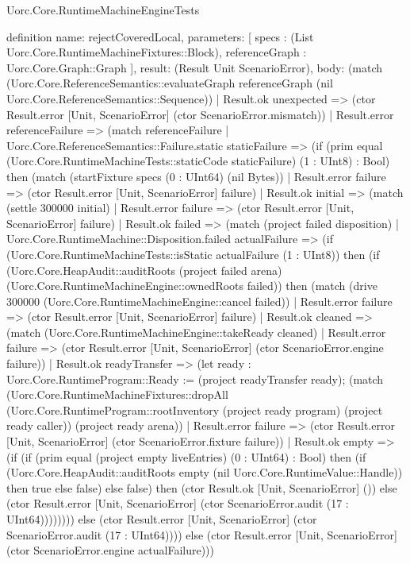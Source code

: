 \begin{lexlean}{Uorc.Core.RuntimeMachineEngineTests}
\begin{semanticmodule}
definition{
  name: rejectCoveredLocal,
  parameters: [
    specs : (List Uorc.Core.RuntimeMachineFixtures::Block),
    referenceGraph : Uorc.Core.Graph::Graph
  ],
  result: (Result Unit ScenarioError),
  body: (match (Uorc.Core.ReferenceSemantics::evaluateGraph referenceGraph (nil Uorc.Core.ReferenceSemantics::Sequence))
    | Result.ok unexpected => (ctor Result.error [Unit, ScenarioError] (ctor ScenarioError.mismatch))
    | Result.error referenceFailure => (match referenceFailure
      | Uorc.Core.ReferenceSemantics::Failure.static staticFailure => (if (prim equal (Uorc.Core.RuntimeMachineTests::staticCode staticFailure) (1 : UInt8) : Bool) then (match (startFixture specs (0 : UInt64) (nil Bytes))
        | Result.error failure => (ctor Result.error [Unit, ScenarioError] failure)
        | Result.ok initial => (match (settle 300000 initial)
          | Result.error failure => (ctor Result.error [Unit, ScenarioError] failure)
          | Result.ok failed => (match (project failed disposition)
            | Uorc.Core.RuntimeMachine::Disposition.failed actualFailure => (if (Uorc.Core.RuntimeMachineTests::isStatic actualFailure (1 : UInt8)) then (if (Uorc.Core.HeapAudit::auditRoots (project failed arena) (Uorc.Core.RuntimeMachineEngine::ownedRoots failed)) then (match (drive 300000 (Uorc.Core.RuntimeMachineEngine::cancel failed))
              | Result.error failure => (ctor Result.error [Unit, ScenarioError] failure)
              | Result.ok cleaned => (match (Uorc.Core.RuntimeMachineEngine::takeReady cleaned)
                | Result.error failure => (ctor Result.error [Unit, ScenarioError] (ctor ScenarioError.engine failure))
                | Result.ok readyTransfer => (let ready : Uorc.Core.RuntimeProgram::Ready := (project readyTransfer ready); (match (Uorc.Core.RuntimeMachineFixtures::dropAll (Uorc.Core.RuntimeProgram::rootInventory (project ready program) (project ready caller)) (project ready arena))
                  | Result.error failure => (ctor Result.error [Unit, ScenarioError] (ctor ScenarioError.fixture failure))
                  | Result.ok empty => (if (if (prim equal (project empty liveEntries) (0 : UInt64) : Bool) then (if (Uorc.Core.HeapAudit::auditRoots empty (nil Uorc.Core.RuntimeValue::Handle)) then true else false) else false) then (ctor Result.ok [Unit, ScenarioError] ()) else (ctor Result.error [Unit, ScenarioError] (ctor ScenarioError.audit (17 : UInt64)))))))) else (ctor Result.error [Unit, ScenarioError] (ctor ScenarioError.audit (17 : UInt64)))) else (ctor Result.error [Unit, ScenarioError] (ctor ScenarioError.engine actualFailure)))
}
\end{semanticmodule}
\end{lexlean}
